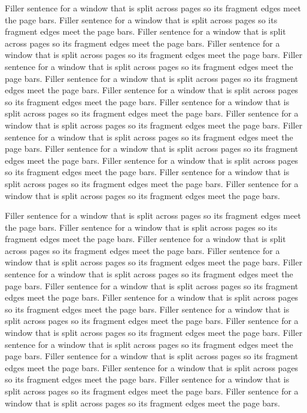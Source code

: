 \documentclass[type=report,theme=light,language=en]{semio}
\begin{document}
\begin{Blockquote}[title={Split Across Pages}]
Filler sentence for a window that is split across pages so its fragment edges meet the page bars. Filler sentence for a window that is split across pages so its fragment edges meet the page bars. Filler sentence for a window that is split across pages so its fragment edges meet the page bars. Filler sentence for a window that is split across pages so its fragment edges meet the page bars. Filler sentence for a window that is split across pages so its fragment edges meet the page bars. Filler sentence for a window that is split across pages so its fragment edges meet the page bars. Filler sentence for a window that is split across pages so its fragment edges meet the page bars. Filler sentence for a window that is split across pages so its fragment edges meet the page bars. Filler sentence for a window that is split across pages so its fragment edges meet the page bars. Filler sentence for a window that is split across pages so its fragment edges meet the page bars. Filler sentence for a window that is split across pages so its fragment edges meet the page bars. Filler sentence for a window that is split across pages so its fragment edges meet the page bars. Filler sentence for a window that is split across pages so its fragment edges meet the page bars. Filler sentence for a window that is split across pages so its fragment edges meet the page bars. 

Filler sentence for a window that is split across pages so its fragment edges meet the page bars. Filler sentence for a window that is split across pages so its fragment edges meet the page bars. Filler sentence for a window that is split across pages so its fragment edges meet the page bars. Filler sentence for a window that is split across pages so its fragment edges meet the page bars. Filler sentence for a window that is split across pages so its fragment edges meet the page bars. Filler sentence for a window that is split across pages so its fragment edges meet the page bars. Filler sentence for a window that is split across pages so its fragment edges meet the page bars. Filler sentence for a window that is split across pages so its fragment edges meet the page bars. Filler sentence for a window that is split across pages so its fragment edges meet the page bars. Filler sentence for a window that is split across pages so its fragment edges meet the page bars. Filler sentence for a window that is split across pages so its fragment edges meet the page bars. Filler sentence for a window that is split across pages so its fragment edges meet the page bars. Filler sentence for a window that is split across pages so its fragment edges meet the page bars. Filler sentence for a window that is split across pages so its fragment edges meet the page bars. 


\end{Blockquote}
\end{document}
